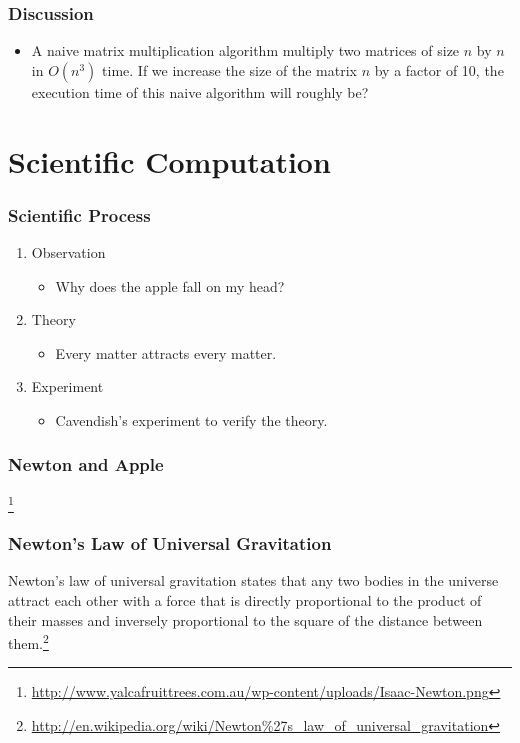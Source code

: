 \documentclass{beamer}
\begin{document}
\begin{CJK}{UTF8}{bsmi}
\begin{frame}
\frametitle{Discussion} 
\begin{itemize}
\item A naive matrix multiplication algorithm multiply two matrices of
  size $n$ by $n$ in $O(n^3)$ time.  If we increase the size of the
  matrix $n$ by a factor of 10, the execution time of this naive
  algorithm will roughly be?
\end{itemize}
\end{frame}

\section{Scientific Computation}

\begin{frame}
\frametitle{Scientific Process} 
\begin{enumerate}
\item Observation
  \begin{itemize}
    \item Why does the apple fall on my head?
  \end{itemize}
\item Theory
  \begin{itemize}
  \item Every matter attracts every matter.
  \end{itemize}
\item Experiment
  \begin{itemize}
  \item Cavendish's experiment to verify the theory.
  \end{itemize}
\end{enumerate}
\end{frame}

\begin{frame}
\frametitle{Newton and Apple}
\centerline{}\footnote{\url{http://www.yalcafruittrees.com.au/wp-content/uploads/Isaac-Newton.png}}
\end{frame}

\begin{frame}
\frametitle{Newton's Law of Universal Gravitation} Newton's law of
universal gravitation states that any two bodies in the universe
attract each other with a force that is directly proportional to the
product of their masses and inversely proportional to the square of
the distance between them.\footnote{\url{http://en.wikipedia.org/wiki/Newton\%27s_law_of_universal_gravitation}}
\end{frame}


\end{CJK}
\end{document}
